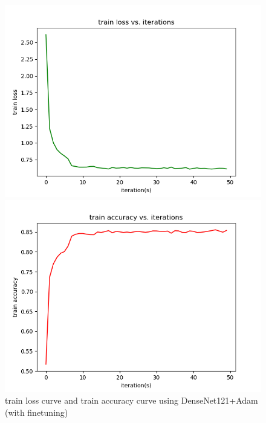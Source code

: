 \documentclass[cn]{elegantbook}
\begin{document}
\begin{figure}[!h]
	\centering
	\begin{minipage}[t]{0.48\textwidth}
		\centering
		\includegraphics[width=\textwidth]{../results/trainloss_den_adam1}
	\end{minipage}
	\begin{minipage}[t]{0.48\textwidth}
		\centering
		\includegraphics[width=\textwidth]{../results/trainacc_den_adam1}
	\end{minipage}
	\caption{\label{trainres_den_adam1}train loss curve and train accuracy curve using DenseNet121+Adam (with finetuning)}
\end{figure}
\end{document}
